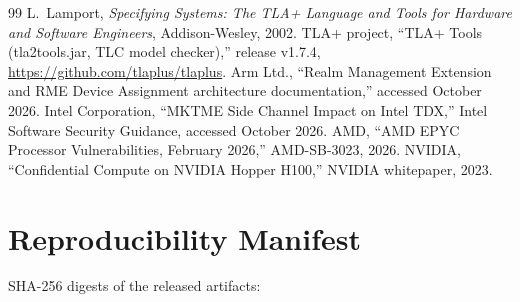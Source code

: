 \documentclass[11pt,letterpaper]{article}
\theoremstyle{plain}
\theoremstyle{definition}
\begin{document}
\begin{thebibliography}{99}
 L.~Lamport, \emph{Specifying Systems: The TLA+ Language and Tools for Hardware and Software Engineers}, Addison-Wesley, 2002.
 TLA+ project, ``TLA+ Tools (tla2tools.jar, TLC model checker),'' release v1.7.4, \url{https://github.com/tlaplus/tlaplus}.
 Arm Ltd., ``Realm Management Extension and RME Device Assignment architecture documentation,'' accessed October 2026.
 Intel Corporation, ``MKTME Side Channel Impact on Intel TDX,'' Intel Software Security Guidance, accessed October 2026.
 AMD, ``AMD EPYC Processor Vulnerabilities, February 2026,'' AMD-SB-3023, 2026.
 NVIDIA, ``Confidential Compute on NVIDIA Hopper H100,'' NVIDIA whitepaper, 2023.
\end{thebibliography}
\normalsize

\appendix
{}

\section{Reproducibility Manifest}\label{app:manifest}
SHA-256 digests of the released artifacts:
\end{document}
